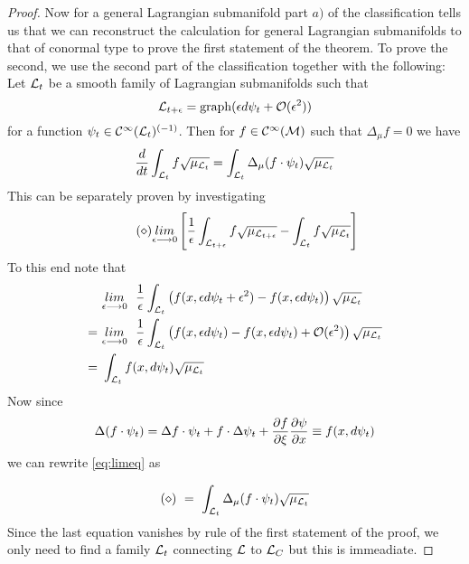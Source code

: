 \begin{theo}
\begin{proof}
  Now for a general Lagrangian submanifold part $a)$ of the classification tells us that we can reconstruct the calculation for general Lagrangian submanifolds to that of conormal type to prove the first statement of the theorem. To prove the second, we use the second part of the classification together with the following:\\

  Let $\mathcal{L}_t$ be a smooth family of Lagrangian submanifolds such that
  \begin{equation}
    \LL_{t+\epsilon} = \graph(\epsilon d\psi_t + \OO(\epsilon^2))
  \end{equation}
  for a function $\psi_t \in \mathcal{C}^{\infty}(\mathcal{L}_t)^{(-1)}$. Then for $f \in \mathcal{C}^{\infty}(\mathcal{M})$ such that $\Delta_\mu f = 0$ we have
  \begin{equation}
    \frac{d }{d t} \int_{\mathcal{L}_t} f \sqrt{\mu_{\mathcal{L}_t}} = \int_{\mathcal{L}_t} \Delta_\mu (f \cdot \psi_t) \sqrt{\mu_{\mathcal{L}_t}}
  \end{equation}
  This can be separately proven by investigating
  \begin{equation}\tag{$\diamond$} \label{eq:limeq}
    \limit{\epsilon \lra 0} \left[ \frac{1}{\epsilon} \int_{\LL_{t + \epsilon}} f \sqrt{\mu_{\LL_{t + \epsilon}}} - \int_{\LL_{t}} f \sqrt{\mu_{\LL_{t}}} \right]
  \end{equation}
  To this end note that
  \begin{align}
    &\limit{\epsilon \lra 0} \ \ \frac{1}{\epsilon} \int_{\LL_{t}} \left( f(x, \epsilon d\psi_t + \epsilon^2) - f(x, \epsilon d\psi_t) \right) \sqrt{\mu_{\LL_{t}}} \\
    = \ &\limit{\epsilon \lra 0} \ \ \frac{1}{\epsilon} \int_{\LL_{t}} \left( f(x, \epsilon d\psi_t) - f(x, \epsilon d\psi_t) + \OO(\epsilon^2) \right) \sqrt{\mu_{\LL_{t}}} \\
    = \ &\int_{\LL_{t}} f(x, d\psi_t) \sqrt{\mu_{\LL_{t}}}
  \end{align}
  Now since
  \begin{align}
    \Delta(f \cdot \psi_t) = \Delta f \cdot \psi_t + f \cdot \Delta \psi_t + \frac{\partial f}{\partial \xi} \frac{\partial \psi}{\partial x} \equiv f(x, d\psi_t)
  \end{align}
  we can rewrite \eqref{eq:limeq} as

  \begin{equation}
    (\diamond) \ = \ \int_{\mathcal{L}_{t}} \Delta_\mu (f \cdot \psi_t) \sqrt{\mu_{\mathcal{L}_{t}}}
  \end{equation}
  Since the last equation vanishes by rule of the first statement of the proof, we only need to find a family $\mathcal{L}_t$ connecting $\mathcal{L}$ to $\mathcal{L}_C$ but this is immeadiate.
\end{proof}
\end{theo}

